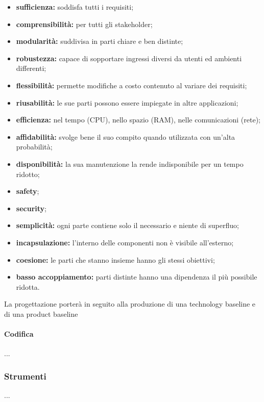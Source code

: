                 \begin{itemize}
                    \item \textbf{sufficienza: }soddisfa tutti i requisiti;
                    \item \textbf{comprensibilità: }per tutti gli stakeholder;
                    \item \textbf{modularità: }suddivisa in parti chiare e ben distinte;
                    \item \textbf{robustezza: }capace di sopportare ingressi diversi da utenti ed ambienti differenti;
                    \item \textbf{flessibilità: }permette modifiche a costo contenuto al variare dei requisiti;
                    \item \textbf{riusabilità: }le sue parti possono essere impiegate in altre applicazioni;
                    \item \textbf{efficienza: }nel tempo (CPU), nello spazio (RAM), nelle comunicazioni (rete);
                    \item \textbf{affidabilità: }svolge bene il suo compito quando utilizzata con un'alta probabilità;
                    \item \textbf{disponibilità: }la sua manutenzione la rende indisponibile per un tempo ridotto;
                    \item \textbf{safety};
                    \item \textbf{security};
                    \item \textbf{semplicità: }ogni parte contiene solo il necessario e niente di superfluo;
                    \item \textbf{incapsulazione: }l'interno delle componenti non è visibile all'esterno;
                    \item \textbf{coesione: }le parti che stanno insieme hanno gli stessi obiettivi;
                    \item \textbf{basso accoppiamento: }parti distinte hanno una dipendenza il più possibile ridotta.
                \end{itemize}
                La progettazione porterà in seguito alla produzione di una technology baseline e di una product baseline
        \paragraph{Codifica}
            ...
    \subsubsection{Strumenti}
        ...
